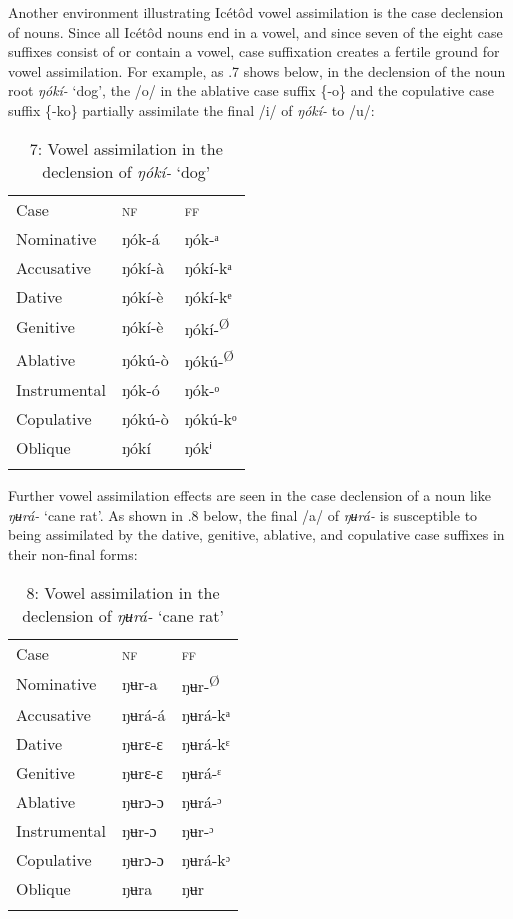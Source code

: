 Another environment illustrating Icétôd vowel assimilation is the case declension of nouns. Since all Icétôd nouns end in a vowel, and since seven of the eight case suffixes consist of or contain a vowel, case suffixation creates a fertile ground for vowel assimilation. For example, as .7 shows below, in the declension of the noun root \textit{ŋókí-} ‘dog’, the /o/ in the ablative case suffix \{-o\} and the copulative case suffix \{-ko\} partially assimilate the final /i/ of \textit{ŋókí-} to /u/:


\begin{table}
\caption{7: Vowel assimilation in the declension of \textit{ŋókí-} ‘dog’}
\label{tab:2}


\begin{tabularx}{\textwidth}{XXX}
\lsptoprule

Case & \textsc{nf} & \textsc{ff}\\
Nominative & ŋók-á & ŋók-ᵃ\\
Accusative & ŋókí-à & ŋókí-kᵃ\\
Dative & ŋókí-è & ŋókí-kᵉ\\
Genitive & ŋókí-è & ŋókí-\textsuperscript{Ø}\\
Ablative & ŋókú-ò & ŋókú-\textsuperscript{Ø}\\
Instrumental & ŋók-ó & ŋók-ᵒ\\
Copulative & ŋókú-ò & ŋókú-kᵒ\\
Oblique & ŋókí & ŋókⁱ\\
\lspbottomrule
\end{tabularx}
\end{table}

Further vowel assimilation effects are seen in the case declension of a noun like \textit{ŋʉrá-} ‘cane rat’. As shown in .8 below, the final /a/ of \textit{ŋʉrá-} is susceptible to being assimilated by the dative, genitive, ablative, and copulative case suffixes in their non-final forms:


\begin{table}
\caption{8: Vowel assimilation in the declension of \textit{ŋʉrá-} ‘cane rat’}
\label{tab:2}


\begin{tabularx}{\textwidth}{XXX}
\lsptoprule

Case & \textsc{nf} & \textsc{ff}\\
Nominative & ŋʉr-a & ŋʉr-\textsuperscript{Ø}\\
Accusative & ŋʉrá-á & ŋʉrá-kᵃ\\
Dative & ŋʉrɛ-ɛ & ŋʉrá-kᵋ\\
Genitive & ŋʉrɛ-ɛ & ŋʉrá-ᵋ\\
Ablative & ŋʉrɔ-ɔ & ŋʉrá-ᵓ\\
Instrumental & ŋʉr-ɔ & ŋʉr-ᵓ\\
Copulative & ŋʉrɔ-ɔ & ŋʉrá-kᵓ\\
Oblique & ŋʉra & ŋʉr\\
\lspbottomrule
\end{tabularx}
\end{table}

